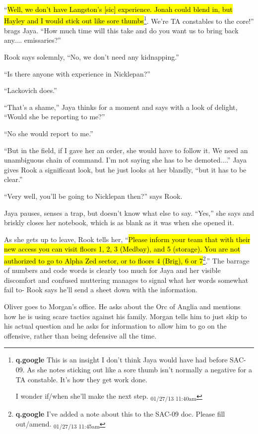 ``\hl{Well, we don't have Langston's {[}sic{]} experience.  Jonah could blend in, but Hayley and I would stick out like sore thumbs}\footnote{\textbf{q.google }This is an insight I don't think Jaya would have had before SAC-09.  As she notes sticking out like a sore thumb isn't normally a negative for a TA constable.  It's how they get work done.

I wonder if/when she'll make the next step. \textsubscript{01/27/13 11:40am}}.  We're TA constables to the core!''  brags Jaya.  ``How much time will this take and do you want us to bring back any.... emissaries?''

Rook says solemnly, ``No, we don't need any kidnapping.''

``Is there anyone with experience in Nicklepan?''

``Lackovich does.''

``That's a shame,'' Jaya thinks for a moment and says with a look of delight, ``Would she be reporting to me?''

``No she would report to me.''

``But in the field, if I gave her an order, she would have to follow it.  We need an unambiguous chain of command.  I'm not saying she has to be demoted....'' Jaya gives Rook a significant look, but he just looks at her blandly, ``but it has to be clear.''

``Very well, you'll be going to Nicklepan then?'' says Rook.



Jaya pauses, senses a trap, but doesn't know what else to say.  ``Yes,'' she says and briskly closes her notebook, which is as blank as it was when she opened it.



As she gets up to leave, Rook tells her, ``\hl{Please inform your team that with their new access you can visit floors 1, 2, 3 (Medbay), and 5 (storage).  You are not authorized to go to Alpha Zed sector, or to floors 4 (Brig), 6 or 7}\footnote{\textbf{q.google }I've added a note about this to the SAC-09 doc.  Please fill out/amend. \textsubscript{01/27/13 11:45am}}.''  The barrage of numbers and code words is clearly too much for Jaya and her visible discomfort and confused muttering manages to signal what her words somewhat fail to- Rook says he'll send a sheet down with the information.  



Oliver goes to Morgan's office.  He asks about the Orc of Anglia and mentions how he is using scare tactics against his family.  Morgan tells him to just skip to his actual question and he asks for information to allow him to go on the offensive, rather than being defensive all the time.

